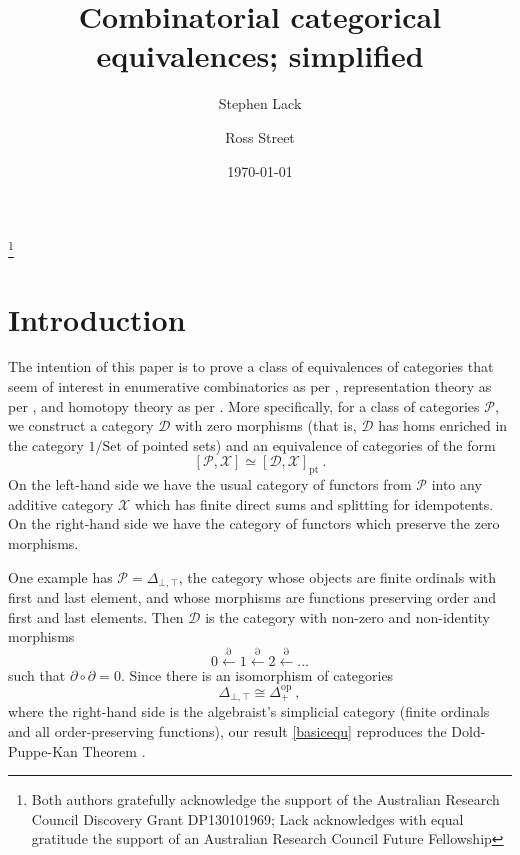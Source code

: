 \documentclass[a4paper,12pt,reqno]{amsart}
\theoremstyle{definition}
\theoremstyle{fact}
\theoremstyle{genquest}
\theoremstyle{step}
\newcommand{\lla}{\longleftarrow}
\def\CD{{\mathscr D}}
\def\CP{{\mathscr P}}
\def\CX{{\mathscr X}}
\begin{document}
\title{Combinatorial categorical equivalences; simplified}

\author{Stephen Lack}
\address{Department of Mathematics, Macquarie University, NSW 2109, Australia}

\author{Ross Street}
\address{Department of Mathematics, Macquarie University, NSW 2109, Australia}

\thanks{Both authors gratefully acknowledge the support of the Australian Research Council Discovery Grant DP130101969; Lack acknowledges with equal gratitude the support of an Australian Research Council Future Fellowship}

\date{\today}
\maketitle

\tableofcontents

\section{Introduction}

The intention of this paper is to prove a class of equivalences of categories that 
seem of interest in enumerative combinatorics as per \cite{Species},
representation theory as per \cite{CEF2012}, 
and homotopy theory as per \cite{Berger1996}.
More specifically, for a class of categories $\CP$, we construct a category $\CD$
with zero morphisms (that is, $\CD$ has homs enriched in the category
$1/\mathrm{Set}$ of pointed sets) and an equivalence of categories of the form
\begin{equation}\label{basicequ}
[\CP,\CX] \simeq [\CD,\CX]_{\mathrm{pt}} \ .
\end{equation}
On the left-hand side we have the usual category of functors from
$\CP$ into any additive category $\CX$ which has finite direct sums
and splitting for idempotents. 
On the right-hand side we have the category of functors which preserve
the zero morphisms.

One example has $\CP = \Delta_{\bot,\top}$, the category whose objects are 
finite ordinals with first and last element, and whose morphisms are functions
preserving order and first and last elements. Then $\CD$ is the category with
non-zero and non-identity morphisms
\begin{equation*}
0\stackrel{\partial}\lla 1 \stackrel{\partial}\lla 2\stackrel{\partial}\lla \dots 
\end{equation*}
such that $\partial \circ \partial = 0$.
Since there is an isomorphism of categories 
\begin{equation}\label{interval}
\Delta_{\bot,\top} \cong \Delta_+^{\mathrm{op}} \ ,
\end{equation} 
where the right-hand side is the algebraist's simplicial category (finite ordinals
and all order-preserving functions),
our result \eqref{basicequ} reproduces the Dold-Puppe-Kan Theorem
\cite{Dold, DoldPuppe, Kan}.  
\end{document}

